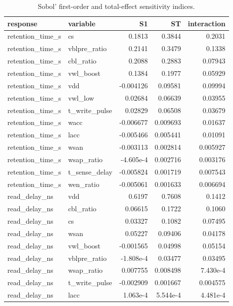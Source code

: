 \begin{table}[!t]
\centering
\caption{Sobol' first-order and total-effect sensitivity indices.}
\label{tab:robustness_sobol_main}
\footnotesize
\begin{tabular}{llrrr}
\toprule
response & variable & S1 & ST & interaction \\
\midrule
retention\_time\_s & cs & 0.1813 & 0.3844 & 0.2031 \\
retention\_time\_s & vblpre\_ratio & 0.2141 & 0.3479 & 0.1338 \\
retention\_time\_s & cbl\_ratio & 0.2088 & 0.2883 & 0.07943 \\
retention\_time\_s & vwl\_boost & 0.1384 & 0.1977 & 0.05929 \\
retention\_time\_s & vdd & -0.004126 & 0.09581 & 0.09994 \\
retention\_time\_s & vwl\_low & 0.02684 & 0.06639 & 0.03955 \\
retention\_time\_s & t\_write\_pulse & 0.02829 & 0.06508 & 0.03679 \\
retention\_time\_s & wacc & -0.006677 & 0.009693 & 0.01637 \\
retention\_time\_s & lacc & -0.005466 & 0.005441 & 0.01091 \\
retention\_time\_s & wsan & -0.003113 & 0.002814 & 0.005927 \\
retention\_time\_s & wsap\_ratio & -4.605e-4 & 0.002716 & 0.003176 \\
retention\_time\_s & t\_sense\_delay & -0.005824 & 0.001719 & 0.007543 \\
retention\_time\_s & wen\_ratio & -0.005061 & 0.001633 & 0.006694 \\
read\_delay\_ns & vdd & 0.6197 & 0.7608 & 0.1412 \\
read\_delay\_ns & cbl\_ratio & 0.06615 & 0.1722 & 0.1060 \\
read\_delay\_ns & cs & 0.03327 & 0.1082 & 0.07495 \\
read\_delay\_ns & wsan & 0.05227 & 0.09406 & 0.04178 \\
read\_delay\_ns & vwl\_boost & -0.001565 & 0.04998 & 0.05154 \\
read\_delay\_ns & vblpre\_ratio & -1.808e-4 & 0.03477 & 0.03495 \\
read\_delay\_ns & wsap\_ratio & 0.007755 & 0.008498 & 7.430e-4 \\
read\_delay\_ns & t\_write\_pulse & -0.002909 & 0.001667 & 0.004575 \\
read\_delay\_ns & lacc & 1.063e-4 & 5.544e-4 & 4.481e-4 \\

\end{tabular}
\end{table}
